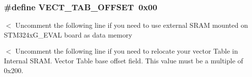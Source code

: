 \subsubsection[{V\+E\+C\+T\+\_\+\+T\+A\+B\+\_\+\+O\+F\+F\+S\+E\+T}]{\setlength{\rightskip}{0pt plus 5cm}\#define V\+E\+C\+T\+\_\+\+T\+A\+B\+\_\+\+O\+F\+F\+S\+E\+T~0x00}\label{group___s_t_m32_f4xx___system___private___defines_ga40e1495541cbb4acbe3f1819bd87a9fe}
$<$ Uncomment the following line if you need to use external S\+R\+A\+M mounted on S\+T\+M324x\+G\+\_\+\+E\+V\+A\+L board as data memory

$<$ Uncomment the following line if you need to relocate your vector Table in Internal S\+R\+A\+M. Vector Table base offset field. This value must be a multiple of 0x200. 